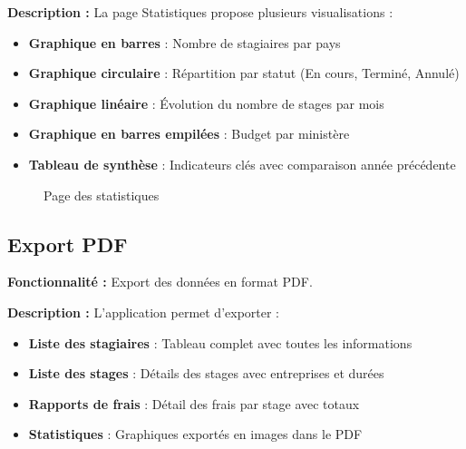 \documentclass[12pt,a4paper]{report}
\begin{document}
\textbf{Description :} La page Statistiques propose plusieurs visualisations :

\begin{itemize}[leftmargin=1cm]
    \item \textbf{Graphique en barres} : Nombre de stagiaires par pays
    \item \textbf{Graphique circulaire} : Répartition par statut (En cours, Terminé, Annulé)
    \item \textbf{Graphique linéaire} : Évolution du nombre de stages par mois
    \item \textbf{Graphique en barres empilées} : Budget par ministère
    \item \textbf{Tableau de synthèse} : Indicateurs clés avec comparaison année précédente
\end{itemize}

\begin{figure}[H]
\centering
{}
\caption{Page des statistiques}
\end{figure}

\subsection{Export PDF}

\textbf{Fonctionnalité :} Export des données en format PDF.

\textbf{Description :} L'application permet d'exporter :

\begin{itemize}[leftmargin=1cm]
    \item \textbf{Liste des stagiaires} : Tableau complet avec toutes les informations
    \item \textbf{Liste des stages} : Détails des stages avec entreprises et durées
    \item \textbf{Rapports de frais} : Détail des frais par stage avec totaux
    \item \textbf{Statistiques} : Graphiques exportés en images dans le PDF
\end{itemize}
\end{document}
